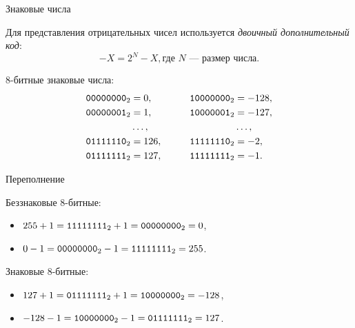 \begin{frame}{Знаковые числа}

  Для представления отрицательных чисел используется \emph{двоичный
  дополнительный код}:
  \[ -X = 2^N - X, \text{где $N$~--- размер числа.}\]

  8-битные знаковые числа:
  \begin{align*}
    \mathtt{0000 0000}_2 &= 0,    &\qquad \mathtt{1000 0000}_2 &= -128, \\
    \mathtt{0000 0001}_2 &= 1,    &\qquad \mathtt{1000 0001}_2 &= -127, \\
                    &\ldots, &\qquad                 &\ldots, \\
    \mathtt{0111 1110}_2 &= 126,  &\qquad \mathtt{1111 1110}_2 &= -2,   \\
    \mathtt{0111 1111}_2 &= 127,  &\qquad \mathtt{1111 1111}_2 &= -1.
  \end{align*}


\end{frame}

\begin{frame}{Переполнение}

  \begin{block}{Беззнаковые 8-битные:}
    \begin{itemize}
      \item $255 + 1 = \mathtt{1111 1111}_2 + 1 = \mathtt{0000 0000}_2 = 0$,
      \item $0 - 1 = \mathtt{0000 0000}_2 - 1 = \mathtt{1111 1111}_2 = 255$.
    \end{itemize}
  \end{block}

  \begin{block}{Знаковые 8-битные:}
    \begin{itemize}
      \item $127 + 1 = \mathtt{0111 1111}_2 + 1 = \mathtt{1000 0000}_2 = -128$,
      \item $-128 - 1 = \mathtt{1000 0000}_2 - 1 = \mathtt{0111 1111}_2 = 127$.
    \end{itemize}
  \end{block}

\end{frame}

